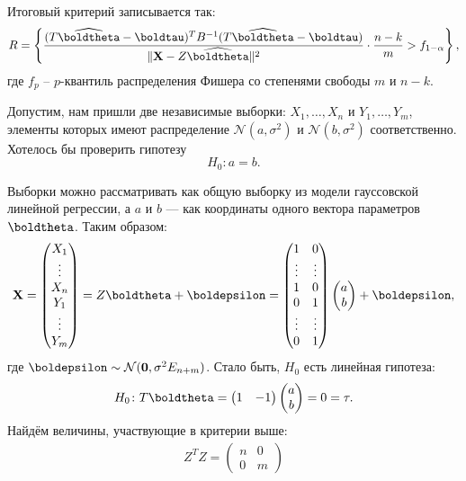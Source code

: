 Итоговый критерий записывается так:
\[
R = \left\{\frac{(T\widehat{\boldtheta} - \boldtau)^T B^{-1} (T\widehat{\boldtheta} - \boldtau)}{\|\mathbf X - Z \widehat{\boldtheta}\|^2}\cdot \frac{n - k}{m} > f_{1-\alpha}\right\},
\]
где $f_{p}$ -- $p$-квантиль распределения Фишера со степенями свободы $m$ и $n-k$.

\begin{example}
    Допустим, нам пришли две независимые выборки: $X_1, \ldots, X_n$ и $Y_1, \ldots, Y_m$, элементы которых имеют распределение $\mathcal{N}(a, \sigma^2)$ и $\mathcal{N}(b, \sigma^2)$ соответственно. Хотелось бы проверить гипотезу
    \[
    H_0\colon a = b.
    \]

    Выборки можно рассматривать как общую выборку из модели гауссовской линейной регрессии, а $a$ и $b$ --- как координаты одного вектора параметров $\boldtheta$. Таким образом:
    \[
    \mathbf X = \begin{pmatrix}
        X_1\\ \vdots \\ X_n \\ Y_1\\ \vdots \\ Y_m
    \end{pmatrix} = Z\boldtheta + \boldepsilon = 
    \begin{pmatrix}
        1 & 0\\ \vdots & \vdots \\ 1 & 0 \\ 0 & 1\\ \vdots & \vdots \\ 0 & 1
    \end{pmatrix}
    \begin{pmatrix}
        a \\ b
    \end{pmatrix} + \boldepsilon,
    \]
    где $\boldepsilon \sim \mathcal{N}(\mathbf 0, \sigma^2 E_{n+m})$. Стало быть, $H_0$ есть линейная гипотеза:
    \[
    H_0\colon T\boldtheta =  \begin{pmatrix}
        1 & -1
    \end{pmatrix}
    \begin{pmatrix}
        a\\ b
    \end{pmatrix}
    = 0 = \tau.
    \]
    Найдём величины, участвующие в критерии выше:
    \begin{gather*}
        Z^T Z = \begin{pmatrix}
            n & 0 \\ 0 & m

\end{pmatrix}
\end{gather*}
\end{example}
